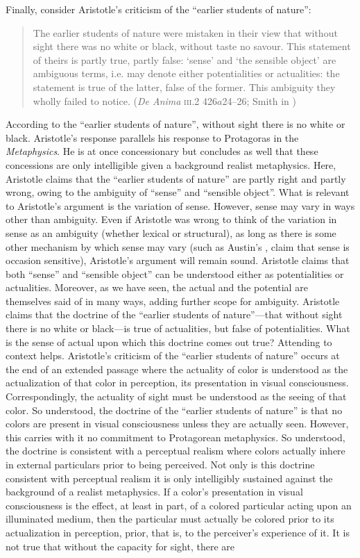 Finally, consider Aristotle's criticism of the ``earlier students of nature'':
\begin{quote}
	The earlier students of nature were mistaken in their view that without sight there was no white or black, without taste no savour. This statement of theirs is partly true, partly false: ‘sense’ and ‘the sensible object’ are ambiguous terms, i.e. may denote either potentialities or actualities: the statement is true of the latter, false of the former. This ambiguity they wholly failed to notice. (\emph{De Anima} \textsc{iii}.2 426\( a \)24--26; Smith in \citealt[46--47]{Barnes:1984uq})
\end{quote}
According to the ``earlier students of nature'', without sight there is no white or black. Aristotle's response parallels his response to Protagoras in the \emph{Metaphysics}. He is at once concessionary but concludes as well that these concessions are only intelligible given a background realist metaphysics. Here, Aristotle claims that the ``earlier students of nature'' are partly right and partly wrong, owing to the ambiguity of ``sense'' and ``sensible object''. What is relevant to Aristotle's argument is the variation of sense. However, sense may vary in ways other than ambiguity. Even if Aristotle was wrong to think of the variation in sense as an ambiguity (whether lexical or structural), as long as there is some other mechanism by which sense may vary (such as Austin's \citeyear[lecture 9]{Austin:1962lr}, claim that sense is occasion sensitive), Aristotle's argument will remain sound. Aristotle claims that both ``sense'' and ``sensible object'' can be understood either as potentialities or actualities. Moreover, as we have seen, the actual and the potential are themselves said of in many ways, adding further scope for ambiguity. Aristotle claims that the doctrine of the ``earlier students of nature''---that without sight there is no white or black---is true of actualities, but false of potentialities. What is the sense of actual upon which this doctrine comes out true? Attending to context helps. Aristotle's criticism of the ``earlier students of nature'' occurs at the end of an extended passage where the actuality of color is understood as the actualization of that color in perception, its presentation in visual consciousness. Correspondingly, the actuality of sight must be understood as the seeing of that color. So understood, the doctrine of the ``earlier students of nature'' is that no colors are present in visual consciousness unless they are actually seen. However, this carries with it no commitment to Protagorean metaphysics. So understood, the doctrine is consistent with a perceptual realism where colors actually inhere in external particulars prior to being perceived. Not only is this doctrine consistent with perceptual realism it is only intelligibly sustained against the background of a realist metaphysics. If a color's presentation in visual consciousness is the effect, at least in part, of a colored particular acting upon an illuminated medium, then the particular must actually be colored prior to its actualization in perception, prior, that is, to the perceiver's experience of it. It is not true that without the capacity for sight, there are 